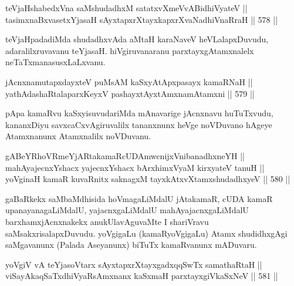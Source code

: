 
\begin{shl}
teVjaHshabedxVna saMshudadhxM satatxvXmeVvABidhiVyateV || \\
tasimxnaBxvasetxYjasaH sAyxtapxrXtayxkapxrXvaNadhiVnaRraH \hfill || 578 ||  
\end{shl}

\begin{artha}
teVjaHpadadiMda shudadhxvAda aMtaH karaNaveV heVLalapxDuvudu,
adaralilxruvavanu teYjasaH. hiVgiruvanaranu parxtayxgAtamxnalelx
neTaTxmanasusxLaLxvanu.
\end{artha}


\begin{shl}
jAcnxnamutapxdayxteV puMsAM kaSxyAtApxpasayx kamaRNaH || \\
yathA\s \s dashaRtalaparxKeyxV pashayxtAyxtAmxnamAtamxni \hfill || 579 ||  
\end{shl}

\begin{artha}
pApa kamaRvu kaSxyisuvudariMda mAnavarige jAcnxnavu huTuTxvudu,
kananxDiyu savxcaCxvAgiruvalilx tananxnunx heVge noVDuvano hAgeye
Atamxnanunx Atamxnalilx noVDuvanu.
\end{artha}


\begin{shl}
gABeYRhoVRmeYjARtakamaRcUDAmwcnijxVnibanadhxneYH || \\
mahAyajecnxYshacx yajecnxYshacx bArxhimxVyaM kirxyateV tanuH || \\
yoVginaH kamaR kuvaRnitx saknagxM tayxkAtxvX\s \s tamxshudadhxyeV \hfill || 580 ||  
\end{shl}

\begin{artha}
gaBaRkekx saMbaMdhisida hoVmagaLiMdalU jAtakamaR, cUDA kamaR
upanayanagaLiMdalU, yajacnxgaLiMdalU mahAyajacnxgaLiMdalU
barxhamxjAcnxnakekx anukUlavAguvaMte I shariVravu
saMsakxrisalapxDuvudu. yoVgigaLu (kamaRyoVgigaLu) Atamx shudidhxgAgi
saMgavanunx (Palada Aseyanunx) biTuTx kamaRvanunx mADuvaru.
\end{artha}


\begin{shl}
yoVgiV vA teYjasoV\s tarx sAyxtapxrXtayxgadxqqSwTx samathaRtaH || \\
viSayAkaqSaTxdhiVyaRsAmxnanx kaSxmaH parxtayxgiVkaSxNeV \hfill || 581 ||  
\end{shl}

